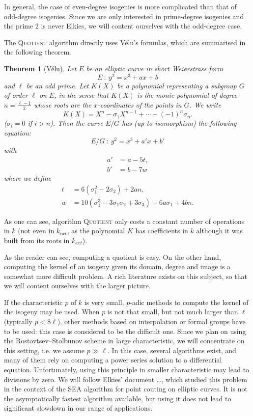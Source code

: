 \documentclass{article}
\newcommand{\algstyle}[1]{\textsc{#1}}
\renewcommand{\v}{\vspace{5mm}}
\newtheorem{theorem}{Theorem}[section]
\theoremstyle{definition}
\begin{document}
In general, the case of even-degree isogenies is
more complicated than that of odd-degree isogenies. Since we are only
interested in prime-degree isogenies and the prime 2 is never Elkies, we
will content ourselves with the odd-degree case.

The \algstyle{Quotient} algorithm directly uses Vélu's formulas, which are
summarised in the following theorem.
\begin{theorem}[Vélu]
Let $E$ be an elliptic curve in short Weierstrass form
\[
E\ :\ y^2 = x^3 + a x + b
\]
and $\ell$ be an odd prime. Let $K(X)$ be a polynomial representing a subgroup $G$
of order $\ell$ on $E$, in the sense that $K(X)$ is the monic polynomial of degree
$n = \frac{\ell - 1}{2}$ whose roots are the $x$-coordinates of the points in $G$.
We write
\[
K(X) = X^n - \sigma_1 X^{n-1} + \cdots + (-1)^n \sigma_n.
\]
($\sigma_i = 0$ if $i>n$).
Then the curve $E/G$ has (up to isomorphism) the following equation:
\[
E/G\ :\ y^2 = x^3 + a' x + b'
\]
with
\[
\begin{aligned}
a' &= a - 5t,\\
b' &= b - 7w
\end{aligned}
\]
where we define
\[
\begin{aligned}
t &= 6 (\sigma_1^2 - 2\sigma_2) + 2 a n,\\
w &= 10 (\sigma_1^3 - 3 \sigma_1\sigma_2 + 3\sigma_3) + 6 a\sigma_1 + 4bn.
\end{aligned}
\]


\end{theorem}

As one can see, algorithm \algstyle{Quotient} only costs a constant number
of operations in $k$ (not even in $k_{ext}$, as the polynomial $K$ has
coefficients in $k$ although it was built from its roots in $k_{ext}$).
\v

As the reader can see, computing a quotient is easy. On the other hand,
computing the kernel of an isogeny given its domain, degree and image is a
somewhat more difficult problem. A rich literature exists on this subject,
so that we will content ourselves with the larger picture.

If the characteristic $p$ of $k$ is very small, $p$-adic methods to compute
the kernel of the isogeny may be used. When $p$ is not that small, but not
much larger than $\ell$ (typically $p < 8\ell$), other methods based on
interpolation or formal groups have to be used: this case is considered to
be the difficult one. Since we plan on using the Rostovtsev--Stolbunov scheme
in large characteristic, we will concentrate on this setting, i.e. we assume
$p\gg\ell$. In this case, several algorithms exist, and many of them
rely on computing a power series solution to a differential equation.
Unfortunately, using this principle in smaller characteristic may lead to
divisions by zero. We will follow Elkies' document \ldots, which studied
this problem in the context of the SEA algorithm for point couting on
elliptic curves. It is not the asymptotically fastest algorithm available,
but using it does not lead to significant slowdown in our range of applications.
\end{document}
